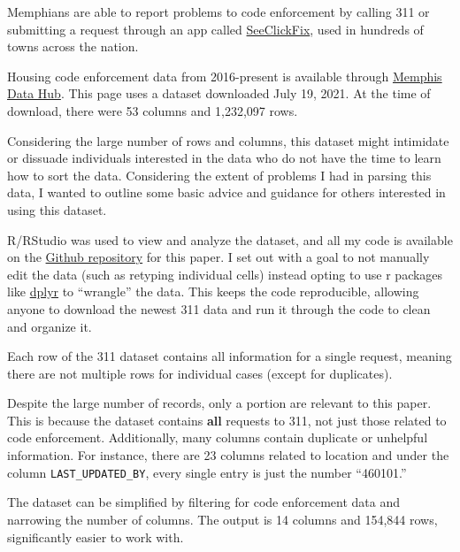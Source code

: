 \documentclass[
  openany]{book}
\begin{document}
Memphians are able to report problems to code enforcement by calling 311 or submitting a request through an app called \href{https://seeclickfix.com/}{SeeClickFix}, used in hundreds of towns across the nation.

Housing code enforcement data from 2016-present is available through \href{https://data.memphistn.gov/dataset/Service-Requests-since-2016/hmd4-ddta}{Memphis Data Hub}. This page uses a dataset downloaded July 19, 2021. At the time of download, there were 53 columns and 1,232,097 rows.

Considering the large number of rows and columns, this dataset might intimidate or dissuade individuals interested in the data who do not have the time to learn how to sort the data. Considering the extent of problems I had in parsing this data, I wanted to outline some basic advice and guidance for others interested in using this dataset.

R/RStudio was used to view and analyze the dataset, and all my code is available on the \href{https://github.com/sj-io/MA-capstone}{Github repository} for this paper. I set out with a goal to not manually edit the data (such as retyping individual cells) instead opting to use r packages like \href{https://dplyr.tidyverse.org/}{dplyr} to ``wrangle'' the data. This keeps the code reproducible, allowing anyone to download the newest 311 data and run it through the code to clean and organize it.

Each row of the 311 dataset contains all information for a single request, meaning there are not multiple rows for individual cases (except for duplicates).

Despite the large number of records, only a portion are relevant to this paper. This is because the dataset contains \textbf{all} requests to 311, not just those related to code enforcement. Additionally, many columns contain duplicate or unhelpful information. For instance, there are 23 columns related to location and under the column \texttt{LAST\_UPDATED\_BY}, every single entry is just the number ``460101.''

The dataset can be simplified by filtering for code enforcement data and narrowing the number of columns. The output is 14 columns and 154,844 rows, significantly easier to work with.
\end{document}
